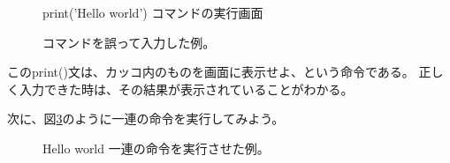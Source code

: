 \begin{figure}[htbp]
	\centering
	\caption{
		\label{fig:hello_world}
		{\ttfamily print('Hello world')} コマンドの実行画面
	}
\end{figure}
\begin{figure}[htbp]
	\centering
	\caption{
		\label{fig:hello_world_error}
		コマンドを誤って入力した例。
	}
\end{figure}

この{\ttfamily print()}文は、カッコ内のものを画面に表示せよ、という命令である。
正しく入力できた時は、その結果が表示されていることがわかる。


次に、図\ref{fig:python_start}のように一連の命令を実行してみよう。
\begin{figure}[htbp]
	\centering
	\caption{
		\label{fig:python_start}
		{\ttfamily Hello world} 一連の命令を実行させた例。
	}
\end{figure}

